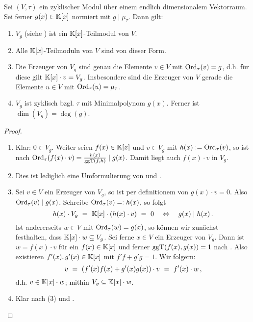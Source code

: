 \begin{satz}
  \label{satz:moduln_ueber_v_g}
  Sei $(V,\tau)$ ein zyklischer Modul über einem endlich dimensionalem
  Vektorraum. Sei ferner $g(x)\in \mathbb{K}[x]$ normiert mit $g\mid \mu_\tau$. 
  Dann gilt:
  \begin{enumerate}
    \item $V_g$ (siehe ) ist ein $\mathbb{K}[x]$-Teilmodul von $V$.
    \item Alle $\mathbb{K}[x]$-Teilmoduln von $V$ sind von dieser Form.
    \item Die Erzeuger von $V_g$ sind genau die Elemente $v\in V$ mit 
      $\operatorname{Ord}_\tau(v) = g$, d.h. für diese gilt
      $\mathbb{K}[x]\cdot v = V_g$.
      Insbesondere sind die Erzeuger von $V$ gerade die Elemente $u\in V$ mit
      $\operatorname{Ord}_\tau(u) = \mu_\tau$.
    \item $V_g$ ist zyklisch bzgl. $\tau$ mit Minimalpolynom $g(x)$.
      Ferner ist $\dim(V_g) = \deg(g)$.
  \end{enumerate}
\end{satz}
\begin{proof}
  \begin{enumerate}
    \item Klar: $0\in V_g$. Weiter seien $f(x) \in \mathbb{K}[x]$ und 
      $v \in V_g$ mit $h(x) := \operatorname{Ord}_\tau(v)$, 
      so ist nach 
      $\operatorname{Ord}_\tau(f(x)\cdot v) = \frac{h(x)}{\operatorname{ggT}(f,h)} \mid g(x)$.
      Damit liegt auch $f(x)\cdot v$ in $V_g$.
    \item Dies ist lediglich eine Umformulierung von
      und .
    \item Sei $v \in V$ ein Erzeuger von $V_g$, so ist per definitionem von 
      $g(x)\cdot v = 0$. Also $\operatorname{Ord}_\tau(v) \mid g(x)$. Schreibe
      $\operatorname{Ord}_\tau(v) =: h(x)$, so folgt
      \[ h(x)\cdot V_g \ =\  \mathbb{K}[x]\cdot (h(x)\cdot v) \ =\ 0
      \quad\Leftrightarrow\quad g(x) \mid h(x)\,.\]
      Ist andererseits $w \in V$ mit $\operatorname{Ord}_\tau(w) = g(x)$, 
      so können wir zunächst festhalten, dass $\mathbb{K}[x] \cdot w \subseteq V_g$.
      Sei ferne $x \in V$ ein Erzeuger von $V_g$. Dann ist $w = f(x)\cdot v$ für
      ein $f(x)\in \mathbb{K}[x]$ und ferner $\operatorname{ggT}(f(x),g(x)) = 1$ nach 
      . Also existieren
      $f'(x),g'(x)\in \mathbb{K}[x]$ mit $f'f + g'g = 1$. Wir folgern:
      \[ v \ =\  (f'(x)f(x) + g'(x)g(x)) \cdot v \ =\ 
        f'(x)\cdot w\,,\]
      d.h. $v \in \mathbb{K}[x]\cdot w$; mithin $V_g \subseteq \mathbb{K}[x]\cdot w$.
    \item Klar nach (3) und .
  \end{enumerate}
\end{proof}


